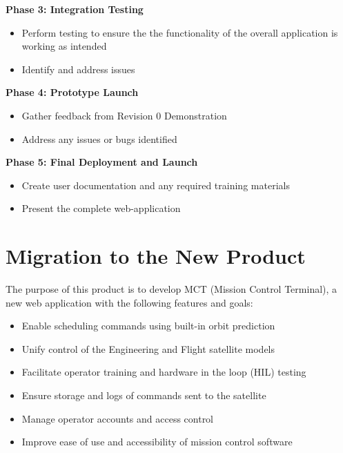 \documentclass[12pt]{article}
\begin{document}
\textbf{Phase 3: Integration Testing}
\begin{itemize}
    \item Perform testing to ensure the the functionality of the overall application is working as intended
    \item Identify and address issues
\end{itemize}

\textbf{Phase 4: Prototype Launch}
\begin{itemize}
    \item Gather feedback from Revision 0 Demonstration
    \item Address any issues or bugs identified
\end{itemize}

\textbf{Phase 5: Final Deployment and Launch}
\begin{itemize}
    \item Create user documentation and any required training materials
    \item Present the complete web-application 
\end{itemize}

\section{Migration to the New Product}
The purpose of this product is to develop MCT (Mission Control Terminal), a new web application with the following features and goals:
\begin{itemize}
    \item  Enable scheduling commands using built-in orbit prediction
    \item Unify control of the Engineering and Flight satellite models
    \item Facilitate operator training and hardware in the loop (HIL) testing
    \item Ensure storage and logs of commands sent to the satellite
    \item Manage operator accounts and access control
    \item Improve ease of use and accessibility of mission control software
\end{itemize}
\end{document}
